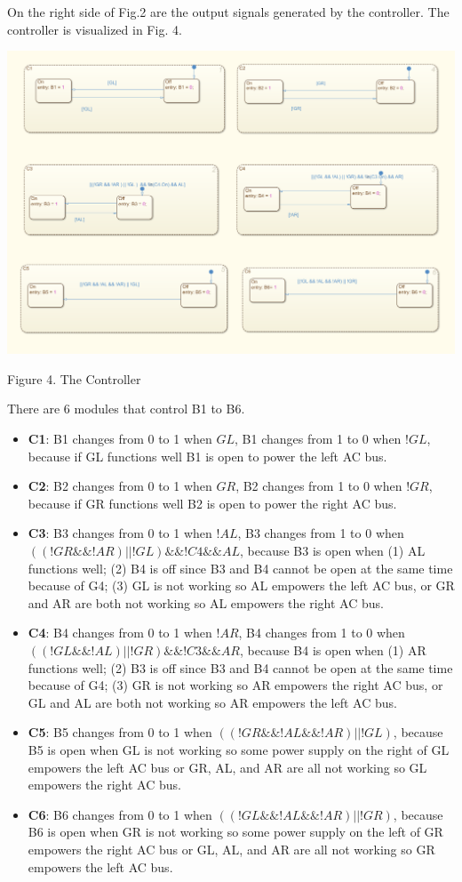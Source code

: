 \documentclass{mcmthesis}
\begin{document}
On the right side of Fig.2 are the output signals generated by the controller. The controller is visualized in Fig. 4.
\begin{center}
\includegraphics[width=14.25cm]{fig4.png}
\end{center}
\begin{center}
\small{Figure 4.  The Controller}
\end{center}
There are 6 modules that control B1 to B6.
\begin{itemize}
\item \textbf{C1}: B1 changes from 0 to 1 when $GL$,  B1 changes from 1 to 0 when $!GL$, because if GL functions well B1 is open to power the left AC bus.
\item \textbf{C2}: B2 changes from 0 to 1 when $GR$,  B2 changes from 1 to 0 when $!GR$, because if GR functions well B2 is open to power the right AC bus.
\item \textbf{C3}: B3 changes from 0 to 1 when $!AL$,  B3 changes from 1 to 0 when \\$((!GR \&\& !AR) || !GL) \&\& !C4\&\& AL$, because B3 is open when (1) AL functions well; (2) B4 is off since B3 and B4 cannot be open at the same time because of G4; (3) GL is not working so AL empowers the left AC bus, or GR and AR are both not working so AL empowers the right AC bus.
\item \textbf{C4}:  B4 changes from 0 to 1 when $!AR$,  B4 changes from 1 to 0 when \\$((!GL \&\& !AL) || !GR) \&\& !C3 \&\& AR$, because B4 is open when (1) AR functions well; (2) B3 is off since B3 and B4 cannot be open at the same time because of G4; (3) GR is not working so AR empowers the right AC bus, or GL and AL are both not working so AR empowers the left AC bus.
\item \textbf{C5}: B5 changes from 0 to 1 when $((!GR \&\& !AL \&\& !AR) || !GL)$, because B5 is open when GL is not working so some power supply on the right of GL empowers the left AC bus or GR, AL, and AR are all not working so GL empowers the right AC bus.
\item \textbf{C6}: B6 changes from 0 to 1 when $((!GL \&\& !AL \&\& !AR) || !GR)$, because B6 is open when GR is not working so some power supply on the left of GR empowers the right AC bus or GL, AL, and AR are all not working so GR empowers the left AC bus. 
\end{itemize}
\pagebreak
\end{document}
